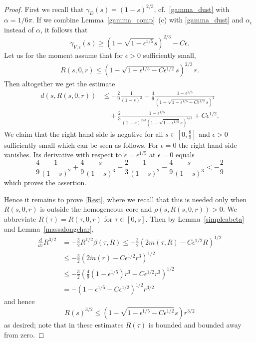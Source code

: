 \documentclass[11pt]{article}
\begin{document}
\begin{proof}
  First we recall that $\gamma_D(s) = (1-s)^{2/3}$, cf.~\eqref{gamma_dust}
  with $\alpha=1/6\pi$.
  If we combine Lemma~\ref{gamma_comp}~(c) with \eqref{gamma_dust}
  and $\alpha_\epsilon$ instead of $\alpha$, it follows that
  \[
  \gamma_{V,\epsilon} (s) \geq (1-\sqrt{1-\epsilon^{1/5}}s)^{2/3} - C \epsilon.
  \]
  Let us for the moment assume that for $\epsilon>0$ sufficiently small,
  \begin{align}\label{Rest}
    R(s,0,r) \leq (1-\sqrt{1-\epsilon^{1/5} - C \epsilon^{1/2}}s)^{2/3}\, r.
  \end{align}
  Then altogether we get the estimate
   \begin{align*}
    d(s,R(s,0,r))
    &
    \leq
    -  \frac{2}{9}\frac{1}{(1-s)^2}
    - \frac{4}{9} 
    \frac{1-\epsilon^{1/5}}{(1-\sqrt{1-\epsilon^{1/5} - C \epsilon^{1/2}}s)^2} \\
    & \quad 
    {}+ \frac{2}{3} \frac{1-\epsilon^{1/5}}{(1-s)^{2/3}
    (1-\sqrt{1-\epsilon^{1/5}}s)^{4/3}}
    + C \epsilon^{1/2}.
  \end{align*}
   We claim that the right hand side is negative for all $s\in [0,\frac{8}{9}]$
   and $\epsilon>0$ sufficiently small which can be seen as follows.
   For $\epsilon=0$
   the right hand side vanishes. Its derivative with respect to
   $\tilde\epsilon=\epsilon^{1/5}$ at $\epsilon=0$ equals
   \[
   \frac{4}{9}\frac{1}{(1-s)^2} + \frac{4}{9}\frac{s}{(1-s)^3}
   - \frac{2}{3}\frac{1}{(1-s)^2} - \frac{4}{9}\frac{s}{(1-s)^3}
   < - \frac{2}{9}
   \]
   which proves the assertion.

   Hence it remains to prove \eqref{Rest},
   where we recall that this is needed only
   when $R(s,0,r)$ is outside the homogeneous core and $\rho(s,R(s,0,r))>0$.
   We abbreviate $R(\tau)=R(\tau,0,r)$ for $\tau \in [0,s]$.
   Then by Lemma~\ref{simpleabeta} and Lemma~\ref{massalongchar},
   \begin{align*}
     \frac{d}{d\tau} R^{3/2}
     &=
     - \frac{3}{2} R^{1/2} \beta(\tau,R) \leq
     - \frac{3}{2}\left(2 m(\tau,R) - C \epsilon^{1/2} R\right)^{1/2}\\
     &\leq
     - \frac{3}{2}\left(2 \mathring m(r) - C \epsilon^{1/2} r^3\right)^{1/2}\\
     &\leq
     - \frac{3}{2}\left(\frac{4}{9} (1-\epsilon^{1/5}) r^3
     - C \epsilon^{1/2} r^3\right)^{1/2}\\
     &=
     -\left(1-\epsilon^{1/5} - C \epsilon^{1/2} \right)^{1/2} r^{3/2}
   \end{align*}
   and hence
   \[
   R(s)^{3/2} \leq (1-\sqrt{1-\epsilon^{1/5} - C \epsilon^{1/2}} s) r^{3/2}
   \]
   as desired; note that in these estimates
   $R(\tau)$ is bounded and bounded away from zero.
\end{proof}
%
%
\end{document}
